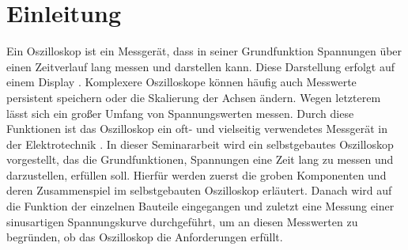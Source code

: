 \section{Einleitung}

Ein Oszilloskop ist ein Messgerät, dass in seiner Grundfunktion Spannungen
über einen Zeitverlauf lang messen und darstellen kann.
Diese Darstellung erfolgt auf einem Display \cite{KnowUrOscilloscope}.
Komplexere Oszilloskope können häufig auch Messwerte persistent speichern oder die Skalierung der Achsen
ändern. Wegen letzterem lässt sich ein großer Umfang von Spannungswerten messen.
Durch diese Funktionen ist das Oszilloskop ein oft- und vielseitig verwendetes Messgerät
in der Elektrotechnik \cite{ETechnikEinfach}. \newline \newline
In dieser Seminararbeit wird ein selbstgebautes Oszilloskop vorgestellt, das die Grundfunktionen,
Spannungen eine Zeit lang zu messen und darzustellen, erfüllen soll. \newline
Hierfür werden zuerst die groben Komponenten und deren Zusammenspiel im selbstgebauten Oszilloskop erläutert.
Danach wird auf die Funktion der einzelnen Bauteile eingegangen und
zuletzt eine Messung einer sinusartigen Spannungskurve durchgeführt,
um an diesen Messwerten zu begründen, ob das Oszilloskop die Anforderungen erfüllt. 
